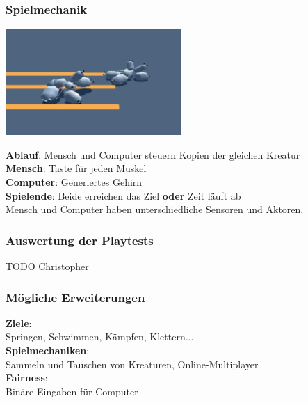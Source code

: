 \documentclass{beamer}
\begin{document}
\begin{frame}
	\frametitle{Spielmechanik}
	
	\includegraphics[width=0.5\textwidth]{img/games/darwin.png}
	\vspace{1em}
	
	\textbf{Ablauf}: Mensch und Computer steuern Kopien der gleichen Kreatur \\
	\vspace{1em}
	\textbf{Mensch}: Taste für jeden Muskel \\
	\textbf{Computer}: Generiertes Gehirn \\
	\vspace{1em}
	\textbf{Spielende}: Beide erreichen das Ziel \textbf{oder} Zeit läuft ab \\
	\vspace{1em}
	Mensch und Computer haben unterschiedliche Sensoren und Aktoren.
\end{frame}

\begin{frame}
	\frametitle{Auswertung der Playtests}
	
	TODO Christopher
\end{frame}


\begin{frame}
	\frametitle{Mögliche Erweiterungen}
	
	\textbf{Ziele}:\\ Springen, Schwimmen, Kämpfen, Klettern... \\
	\vspace{2em}
	\textbf{Spielmechaniken}:\\ Sammeln und Tauschen von Kreaturen, Online-Multiplayer \\
	\vspace{2em}
	\textbf{Fairness}:\\ Binäre Eingaben für Computer
\end{frame}
\end{document}
